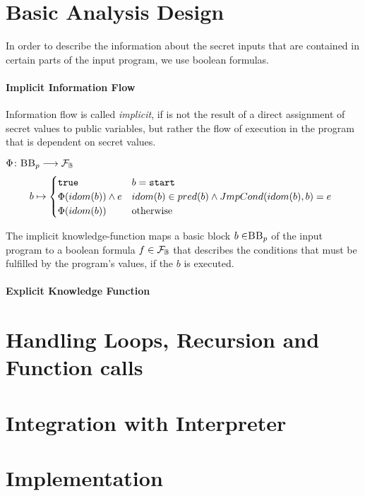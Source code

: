 \section{Basic Analysis Design}




In order to describe the information about the secret inputs that are contained in certain parts of the input program, we use boolean formulas.

\paragraph{Implicit Information Flow}
Information flow is called \emph{implicit}, if is not the result of a direct assignment of secret values to public variables, but rather the flow of execution in the program that is dependent on secret values.


\begin{definition} 
    \begin{center}
        $\Phi\colon \mbb_p \longrightarrow \mbform$ \\
        \begin{equation*}
            b \mapsto
        \begin{cases}
            \mttt & b = \mathtt{start} \\
            \Phi(idom(b)) \land e & \parbox[t]{.6\textwidth}{$idom(b) \in pred(b) \land JmpCond(idom(b), b) = e$}\\ 
            \Phi(idom(b)) & \text{otherwise}\\ 
        \end{cases}
        \end{equation*}
    \end{center}
    The implicit knowledge-function maps a basic block $b \in \mbb_p$ of the input program \p to a boolean formula $f \in \mathcal{F}_{\mathbb{B}}$ that describes the conditions that must be fulfilled by the program's values, if the $b$ is executed.
\end{definition}



\paragraph{Explicit Knowledge Function}


\section{Handling Loops, Recursion and Function calls}

\section{Integration with Interpreter}

\section{Implementation}